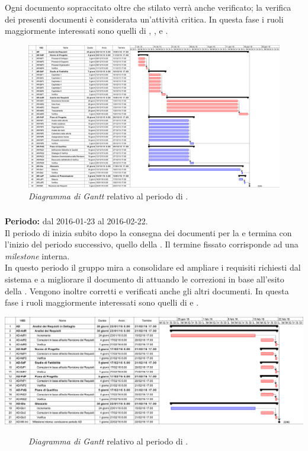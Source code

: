 Ogni documento sopraccitato oltre che stilato verrà anche verificato; la verifica dei presenti documenti è considerata un'attività critica.
In questa fase i ruoli maggiormente interessati sono quelli di \textit{\Amm}, \textit{\Res}, \textit{\Ana} e \textit{\Ver}. 
\begin{figure}
	\centering
	\includegraphics[keepaspectratio = true, width=23cm]{immagini/PdP_AnalisiDeiRequisitiGantt.png}
	\caption{\textit{Diagramma di Gantt} relativo al periodo di \AR.}\label{etichetta}
\end{figure}
\newpage

\subsubsection{\AD}
\textbf{Periodo:} dal 2016-01-23 al 2016-02-22. \\
Il periodo di \AD inizia subito dopo la consegna dei documenti per la \RR e termina con l'inizio del periodo successivo, quello della \PA. Il termine fissato corrisponde ad una \textit{milestone} interna. \\
In questo periodo il gruppo mira a consolidare ed ampliare i requisiti richiesti dal sistema e a migliorare il documento di \textit{\AdR} attuando le correzioni in base all'esito della \RR.
Vengono inoltre corretti e verificati anche gli altri documenti. 
In questa fase i ruoli maggiormente interessati sono quelli di \textit{\Ana} e \textit{\Ver}.  
\begin{center}
	\includegraphics[keepaspectratio = true, width=16cm]{immagini/PdP_AnalisiDeiRequisitiInDettaglioGantt.png}
\end{center}
\begin{figure}[h]
	\caption{\textit{Diagramma di Gantt} relativo al periodo di \AD.}\label{etichetta}
\end{figure}


